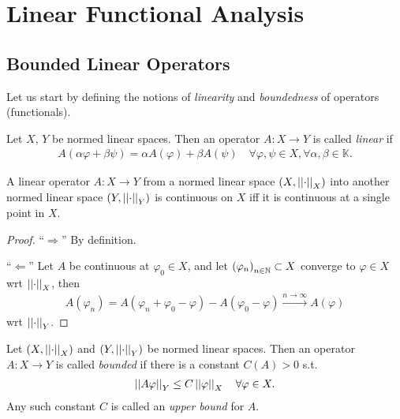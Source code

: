 \section{Linear Functional Analysis}

\subsection{Bounded Linear Operators}

Let us start by defining the notions of \textit{linearity} and \textit{boundedness} of operators (\mbox{functionals}). 

\begin{defn}\label{defn:linearity_operator}
	Let $X$, $Y$ be normed linear spaces. Then an operator 
	$A:X\to Y$ is called \textit{linear} if 
	\begin{align}
		A(\alpha \varphi + \beta \psi) = \alpha A(\varphi) + \beta A(\psi) \quad \forall \varphi, \psi\in X, \forall \alpha, \beta\in \mathbb K.
	\end{align}
\end{defn}

\begin{theorem}
	A linear operator $A: X\to Y$ from a normed linear space $(X, \norm{\cdot}{X})$ into another normed linear space $(Y, \norm{\cdot}{Y})$ is continuous on $X$ iff it is continuous at a single point in $X$.
\end{theorem}

\begin{proof}
	\enquote{$\Longrightarrow$} By definition. 
	
	\enquote{$\Longleftarrow$} Let $A$ be continuous at $\varphi_0\in X$, and let $\seq[\varphi_n]\subset X$ converge to $\varphi\in X$ wrt $\norm{\cdot}{X}$, then
	\begin{align}
		A(\varphi_n) = A(\varphi_n + \varphi_0 - \varphi) - A(\varphi_0 - \varphi) \overset{n\to\infty}{\longrightarrow} A(\varphi)
	\end{align} 
	wrt $\norm{\cdot}{Y}$.
\end{proof}

\begin{defn}\label{defn:boundedness_operator}
	Let $\left(X, \norm{\cdot}{X}\right)$ and $(Y, \norm{\cdot}{Y})$ be normed linear spaces. Then an operator $A: X\to Y$ is called \textit{bounded} if there is a constant $C(A) > 0$ s.t. 
	\begin{align}
		\norm{A\varphi}{Y} \leq C \norm{\varphi}{X} \quad\forall \varphi\in X.
	\end{align}
	Any such constant $C$ is called an \textit{upper bound} for $A$.
\end{defn}

